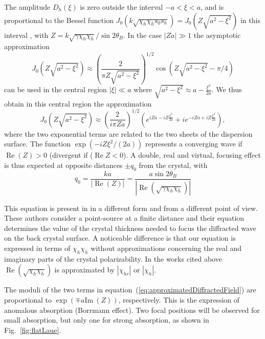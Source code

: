 \documentclass[preprint]{iucr}              %
\begin{document}
The amplitude $D_h(\xi)$ is zero outside the interval $-a<\xi<a$,
and is proportional to the Bessel function $J_0(k \sqrt{\chi_h \chi_{\bar h} s_0 s_h})=J_0(Z\sqrt{a^2-\xi^2})$ in this interval \cite{kato1961}, with  $Z=k\sqrt{\gamma\chi_h\chi_{\bar h}}/\sin2\theta_B$. In the case $|Z a| \gg 1$ the asymptotic approximation
\begin{equation}
    J_0(Z\sqrt{a^2-\xi^2})\approx \left(\frac{2}{\pi Z \sqrt{a^2-\xi^2}}\right)^{1/2} \cos(Z\sqrt{a^2-\xi^2}-\pi/4)
\end{equation}
can be used in the central region $|\xi|\ll a$ where $\sqrt{a^2-\xi^2} \approx a - \frac{\xi^2}{2a}$.
We thus obtain in this central region the approximation
\begin{equation}
\label{eq:approximatedDiffractedField}
    J_0(Z\sqrt{a^2-\xi^2})\approx \left(\frac{2}{i \pi Z a}\right)^{1/2} \left( e^{iZa-i Z\frac{ \xi^2}{2a}} + i 
    e^{-i Z a+i Z\frac{\xi^2}{2a}} \right),
\end{equation}
where the two exponential terms are related to the two sheets of the dispersion surface. 
The function $\exp(- i Z \xi^2 / (2 a))$ 
represents a converging wave if $\operatorname{Re}(Z)>0$ (divergent if  ($\operatorname{Re} Z <0$). A double, real and virtual, focusing effect is thus expected at opposite distances $\pm q_0$ from the crystal, with
\begin{equation}
\label{eq:q0}
    q_0 = \frac{k a}{|\operatorname{Re}(Z)|}= \frac{a \sin2\theta_B}{|\operatorname{Re}(\sqrt{\gamma\chi_h\chi_{\bar h}})|}
\end{equation}

This equation is present in \cite{Kohn2000, KohnGorobtsov2013} in a different form and from a different point of view. These authors consider a point-source at a finite distance and their equation determines the value of the crystal thickness needed to focus the diffracted wave on the back crystal surface. A noticeable difference is that our equation is expressed in terms of $\chi_h \chi_{\bar h}$ without approximations  concerning the real and imaginary parts of the crystal polarizability. In the works cited above $\operatorname{Re} (\sqrt{\chi_h \chi_{\bar h}})$ is approximated by $|\chi_{hr}|$ or $|\chi_h|$.

The moduli of the two terms in equation~(\ref{eq:approximatedDiffractedField}) are proportional to $\exp(\mp a \text{Im}~(Z))$, respectively. This is the expression of anomalous absorption (Borrmann effect). Two focal positions will be observed for small absorption, but only one for strong absorption, as shown in Fig.~\ref{fig:flatLaue}.
\end{document}
